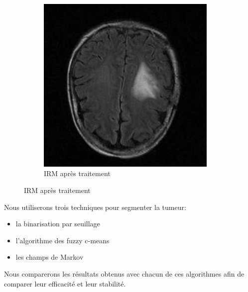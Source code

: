 \begin{figure}[t!]
\begin{subfigure}[b]{0.5\textwidth}
        \includegraphics[width=0.95\textwidth]{images/IRMcoupe17-t2.jpg}
	\caption{IRM après traitement}\label{irm2}
    \end{subfigure}
\end{figure}

Nous utiliserons trois techniques pour segmenter la tumeur:
\begin{itemize}
	\item la binarisation par seuillage
	\item l'algorithme des fuzzy c-means
	\item les champs de Markov
\end{itemize}

\bigskip

Nous comparerons les résultats obtenus avec chacun de ces algorithmes afin de comparer leur efficacité et leur stabilité.